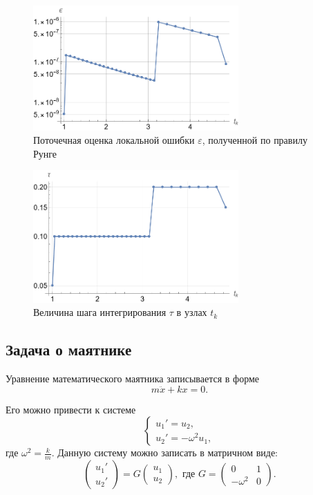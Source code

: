 \documentclass[12pt, a4paper]{article}
\begin{document}
	\begin{figure}[!h]
		\centering
		\includegraphics[width=0.7\textwidth]{auto_eps}
		\caption{Поточечная оценка локальной ошибки $\varepsilon$, полученной по правилу Рунге}
		\label{auto_eps}
	\end{figure}
	
	\begin{figure}[!h]
		\centering
		\includegraphics[width=0.7\textwidth]{auto_tau}
		\caption{Величина шага интегрирования $\tau$ в узлах $t_k$}
		\label{auto_tau}
	\end{figure}
	
	\subsection{Задача о маятнике}
	
	Уравнение математического маятника записывается в форме
	\[
	m \ddot{x} + kx = 0.
	\]
	
	Его можно привести к системе
	\[
	\begin{cases}
		u_1' = u_2, \\
		u_2' = - \omega^2 u_1,
	\end{cases}
	\]
	где $\omega^2 = \frac{k}{m}$. Данную систему можно записать в матричном виде:
	\[
	\begin{pmatrix} u_1' \\ u_2' \end{pmatrix} =
	G \begin{pmatrix} u_1 \\ u_2 \end{pmatrix}, \textrm{ где }
	G = \begin{pmatrix} 0 & 1 \\ -\omega^2 & 0 \end{pmatrix}.
	\]
	
\end{document}
